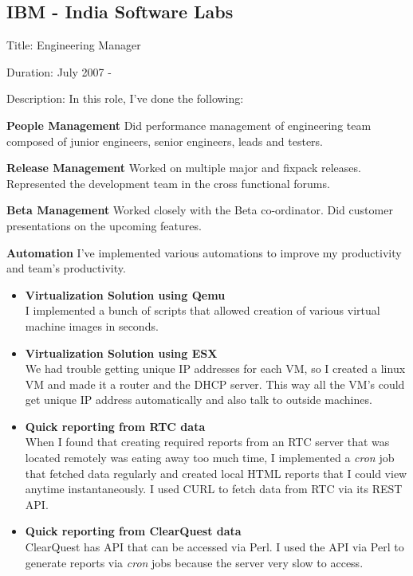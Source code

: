 \documentclass [a4paper,11pt] {article}
\begin{document}
\subsection*{IBM - India Software Labs}
\begin{description}
\item{Title:} Engineering Manager
\item{Duration:} July 2007 -
\item{Description:} In this role, I've done the following:
	    \begin{description}
	    \item{\bf People Management} Did performance management of engineering team composed of junior engineers, senior engineers, leads and testers.
	    \item{\bf Release Management} Worked on multiple major and fixpack releases. Represented the development team in the cross functional forums.
	    \item{\bf Beta Management} Worked closely with the Beta co-ordinator. Did customer presentations on the upcoming features.
	    \item{\bf Automation} I've implemented various automations to improve my productivity and team's productivity.
	    	\begin{itemize}
		\item{\bf Virtualization Solution using Qemu}\\I implemented a bunch of scripts that allowed creation of various virtual machine images in seconds.
		\item{\bf Virtualization Solution using ESX}\\We had trouble
		getting unique IP addresses for each VM, so I created a linux
		VM and made it a router and the DHCP server. This way all the
		VM's could get unique IP address automatically and also talk to
		outside machines. 
		\item{\bf Quick reporting from RTC data}\\
		When I found that creating required reports from an RTC server
		that was located remotely was eating away too much time, I
		implemented a {\it cron} job that fetched data regularly and created
		local HTML reports that I could view anytime instantaneously. I
		used CURL to fetch data from RTC via its REST API.
		\item{\bf Quick reporting from ClearQuest data}\\
			ClearQuest has API that can be accessed via Perl. I
			used the API via Perl to generate reports via {\it cron} jobs
			because the server very slow to access.
		\end{itemize}
	    \end{description}

\end{description}
\end{document}
